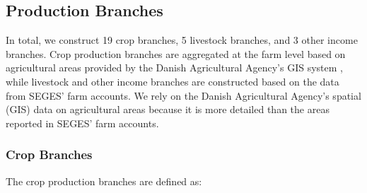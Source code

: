 \documentclass[12pt]{article}
\begin{document}
\subsection{Production Branches}
\label{sec:production-branches} 
In total, we construct 19 crop branches, 5 livestock branches, and 3 other income branches.
Crop production branches are aggregated at the farm level based on agricultural areas provided by the Danish Agricultural Agency's GIS system \citep{landbrugsstyrelsen2026b}, while livestock and other income branches are constructed based on the data from SEGES' farm accounts. 
We rely on the Danish Agricultural Agency's spatial (GIS) data on agricultural areas because it is more detailed than the areas reported in SEGES’ farm accounts.  

\subsubsection{Crop Branches}
The crop production branches are defined as:
\end{document}
